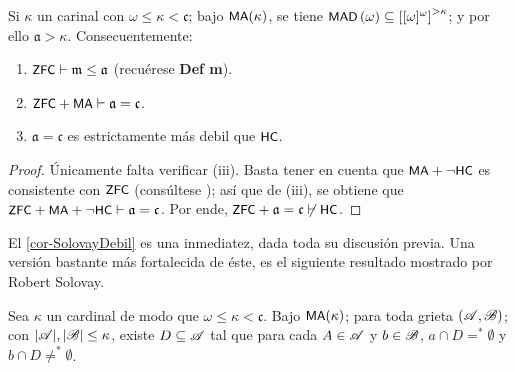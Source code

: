 	\begin{corolario}\label{cor-MaSimple}
		Si $\kappa$ un carinal con $\omega \leq \kappa <\mathfrak{c}$; bajo $\text{\textsf{\small MA}}(\kappa)$, se tiene $\operatorname{\text{\textsf{\small MAD}}}\,(\omega) \subseteq \left[[\omega]^\omega\right]^{>\kappa}$; y por ello $\mathfrak{a}>\kappa$.
		Consecuentemente:
		\begin{enumerate}
			\item $\text{\textsf{\small ZFC}} \vdash \mathfrak{m} \leq \mathfrak{a}$ (recuérese \textbf{Def m}).
			\item $\text{\textsf{\small ZFC}} + \text{\textsf{\small MA}} \vdash \mathfrak{a}=\mathfrak{c}$.
			\item $\mathfrak{a} = \mathfrak{c}$ es estrictamente más debil que $\text{\textsf{\small HC}}$.
		\end{enumerate}
	\end{corolario}

	\begin{proof}
		Únicamente falta verificar (iii). Basta tener en cuenta que $\text{\textsf{\small MA}} + \lnot \text{\textsf{\small HC}}$ es consistente con $\text{\textsf{\small ZFC}}$ (consúltese \cite[p.~279-281]{kunenSet}); así que de (iii), se obtiene que $\text{\textsf{\small ZFC}} + \text{\textsf{\small MA}} + \lnot \text{\textsf{\small HC}} \vdash \mathfrak{a}=\mathfrak{c}$. Por ende, $\text{\textsf{\small ZFC}} + \mathfrak{a}=\mathfrak{c} \not\vdash \text{\textsf{\small HC}}$. 
	\end{proof}

	El \autoref{cor-SolovayDebil} es una inmediatez, dada toda su discusión previa. Una versión bastante más fortalecida de éste, es el siguiente resultado mostrado por Robert Solovay.

	\begin{lema}[Solovay]\label{lem-Solovay}
		Sea $\kappa$ un cardinal de modo que $\omega \leq \kappa < \mathfrak{c}$. Bajo $\text{\textsf{\small MA}}(\kappa)$; para toda grieta $(\mathscr{A},\mathscr{B})$; con $|\mathscr{A}|,|\mathscr{B}|\leq \kappa$, existe $D\subseteq \mathscr{A}$ tal que para cada $A \in \mathscr{A}$ y $b \in \mathscr{B}$, $a \cap D=^*\emptyset$ y $b \cap D\neq ^*\emptyset$.
	\end{lema}

